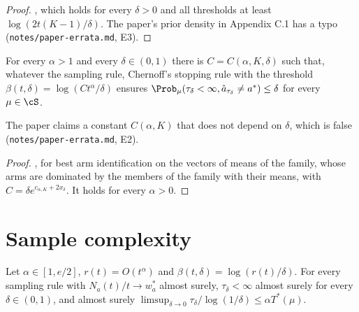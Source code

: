 \begin{proof}
  \leanok
  , which holds for every $\delta > 0$ and all thresholds at least
  $\log(2t(K-1)/\delta)$. The paper's prior density in Appendix C.1 has a typo
  (\texttt{notes/paper-errata.md}, E3).
\end{proof}

\begin{proposition}[{\cite[Proposition 12]{GK16}}]
  \label{prop:deviational}
  \leanok
  For every $\alpha > 1$ and every $\delta \in (0, 1)$ there is $C = C(\alpha, K, \delta)$ such
  that, whatever the sampling rule, Chernoff's stopping rule with the threshold
  $\beta(t, \delta) = \log(C t^\alpha / \delta)$ ensures
  $\Prob_\mu(\tau_\delta < \infty, \hat a_{\tau_\delta} \ne a^*) \le \delta$ for every $\mu \in \cS$.
\end{proposition}

The paper claims a constant $C(\alpha, K)$ that does not depend on $\delta$, which is false
(\texttt{notes/paper-errata.md}, E2).

\begin{proof}
  \leanok
  , for best arm identification on the vectors of means of the family,
  whose arms are dominated by the members of the family with their means, with
  $C = \delta e^{c_{\alpha,K} + 2x_\delta}$. It holds for every $\alpha > 0$.
\end{proof}

\chapter{Sample complexity}
\label{chap:sc}

\begin{proposition}[{\cite[Proposition 13]{GK16}}]
  \label{prop:as}
  \leanok
  Let $\alpha \in [1, e/2]$, $r(t) = O(t^\alpha)$ and $\beta(t, \delta) = \log(r(t)/\delta)$. For
  every sampling rule with $N_a(t)/t \to w^*_a$ almost surely, $\tau_\delta < \infty$ almost surely
  for every $\delta \in (0, 1)$, and almost surely
  $\limsup_{\delta \to 0} \tau_\delta / \log(1/\delta) \le \alpha T^*(\mu)$.
\end{proposition}

